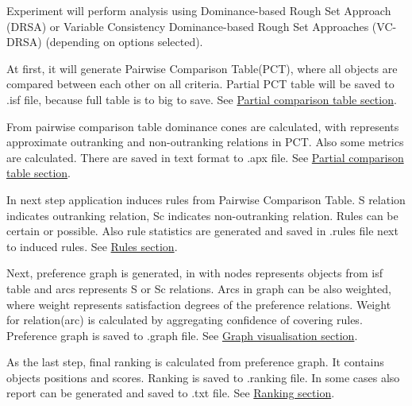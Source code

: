 Experiment will perform analysis using Dominance-based Rough Set Approach (DRSA) or Variable Consistency Dominance-based Rough Set Approaches (VC-DRSA) (depending on options selected).
 
 At first, it will generate Pairwise Comparison Table(PCT), where all objects are compared between each other on all criteria. Partial PCT table will be saved to .isf file, because full table is to big to save.
 See \hyperref[sub:pct-isf]{Partial comparison table section}.
 
 From pairwise comparison table dominance cones are calculated, with represents approximate outranking and non-outranking relations in PCT. Also some metrics are calculated. There are saved in text format to .apx file. 
 See \hyperref[sub:pct-apx]{Partial comparison table section}.
 
 In next step application induces rules from Pairwise Comparison Table. S relation indicates outranking relation, Sc indicates non-outranking relation. Rules can be certain or possible. Also rule statistics are generated and saved in .rules file next to induced rules. 
 See \hyperref[section:rules]{Rules section}.
 
 Next, preference graph is generated, in with nodes represents objects from isf table and arcs represents S or Sc relations. Arcs in graph can be also weighted, where weight represents satisfaction degrees of the preference relations. Weight for relation(arc) is calculated by aggregating confidence of covering rules. Preference graph is saved to .graph file.
 See \hyperref[section:graph]{Graph visualisation section}.
 
 As the last step, final ranking is calculated from preference graph. It contains objects positions and scores. Ranking is saved to .ranking file. In some cases also report can be generated and saved to .txt file.
  See \hyperref[section:ranking]{Ranking section}.
 
 
\vfill\newpage